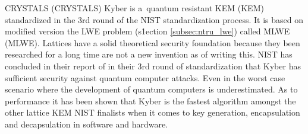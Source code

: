 CRYSTALS (\acl{CRYSTALS}) Kyber is a~quantum resistant KEM (\acl{KEM}) standardized in the 3rd round of the NIST standardization process. It is based on modified version the LWE problem (s1ection \ref{subsec:ntru_lwe}) called MLWE (\acl{MLWE}). Lattices have a solid theoretical security foundation because they been researched for a long time are not a new invention as of writing this. NIST has concluded in their report of in their 3rd round of standardization that Kyber has sufficient security against quantum computer attacks. Even in the worst case scenario where the development of quantum computers is underestimated. As to performance it has been shown that Kyber is the fastest algorithm amongst the other lattice KEM NIST finalists when it comes to key generation, encapsulation and decapsulation in software and hardware. \cite{Grimes2020}\cite{Alagic2022}

